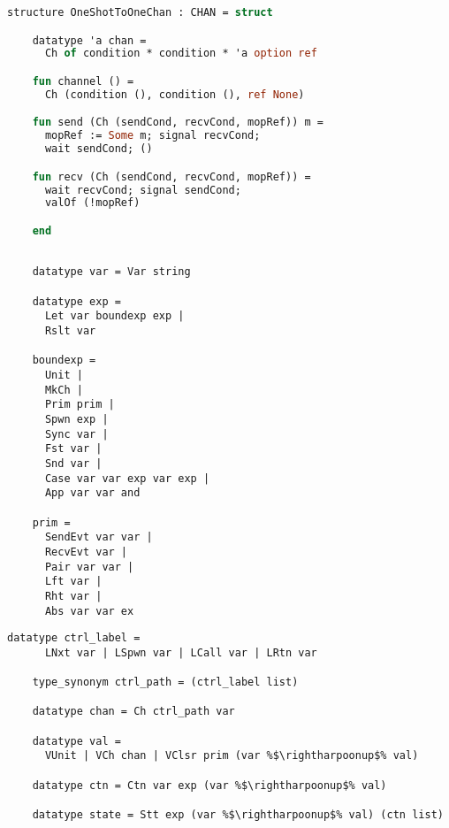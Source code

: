 \documentclass{article}
\begin{document}
\begin{lstlisting}[language=ML, style=codestyle1]
  structure OneShotToOneChan : CHAN = struct

    datatype 'a chan =
      Ch of condition * condition * 'a option ref

    fun channel () =
      Ch (condition (), condition (), ref None)

    fun send (Ch (sendCond, recvCond, mopRef)) m =
      mopRef := Some m; signal recvCond;  
      wait sendCond; ()

    fun recv (Ch (sendCond, recvCond, mopRef)) =
      wait recvCond; signal sendCond;
      valOf (!mopRef)

    end
  \end{lstlisting}

  \begin{lstlisting}[style=codestyle1]

    datatype var = Var string

    datatype exp = 
      Let var boundexp exp |
      Rslt var

    boundexp =
      Unit |
      MkCh |
      Prim prim |
      Spwn exp |
      Sync var |
      Fst var |
      Snd var |
      Case var var exp var exp |
      App var var and

    prim = 
      SendEvt var var |
      RecvEvt var |
      Pair var var |
      Lft var |
      Rht var |
      Abs var var ex

  \end{lstlisting}


  \begin{lstlisting}[style=codestyle1, escapechar=\%]
    datatype ctrl_label = 
      LNxt var | LSpwn var | LCall var | LRtn var

    type_synonym ctrl_path = (ctrl_label list)

    datatype chan = Ch ctrl_path var

    datatype val = 
      VUnit | VCh chan | VClsr prim (var %$\rightharpoonup$% val)

    datatype ctn = Ctn var exp (var %$\rightharpoonup$% val)  

    datatype state = Stt exp (var %$\rightharpoonup$% val) (ctn list) 

    \end{lstlisting}
\end{document}
